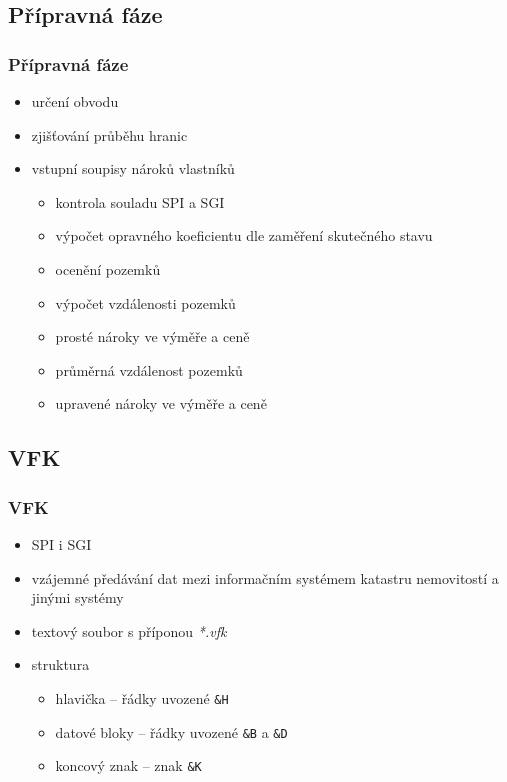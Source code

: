 \documentclass{beamer}
\begin{document}

\subsection{Přípravná fáze}

\begin{frame}

\frametitle{Přípravná fáze}

\begin{itemize}
	\item určení obvodu
	\item zjišťování průběhu hranic
	\item vstupní soupisy nároků vlastníků
	\begin{itemize}
		\item kontrola souladu SPI a SGI
		\item výpočet opravného koeficientu dle zaměření skutečného stavu
		\item ocenění pozemků
		\item výpočet vzdálenosti pozemků
		\item prosté nároky ve výměře a ceně
		\item průměrná vzdálenost pozemků
		\item upravené nároky ve výměře a ceně
	\end{itemize}
\end{itemize}

\end{frame}


\subsection{VFK}

\begin{frame}

\frametitle{VFK}

\begin{itemize}
	\item SPI i SGI
	\item vzájemné předávání dat mezi informačním systémem katastru nemovitostí a jinými systémy
	\item textový soubor s příponou \textit{*.vfk}
	\item struktura
	\begin{itemize}
		\item hlavička – řádky uvozené \texttt{\&H}
		\item datové bloky – řádky uvozené \texttt{\&B} a \texttt{\&D}
		\item koncový znak – znak \texttt{\&K}
	\end{itemize}
\end{itemize}

\end{frame}
\end{document}
